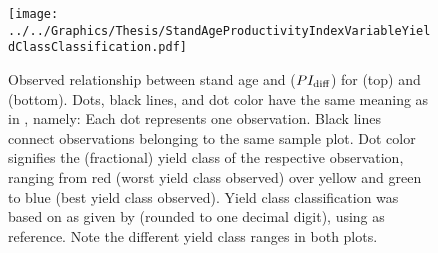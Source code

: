 \begin{figure}[t]
  \texttt{[image: ../../Graphics/Thesis/StandAgeProductivityIndexVariableYieldClassClassification.pdf]}
  \caption{Observed relationship between stand age and \ProductivityIndexVariableText{} (\(PI_{\text{diff}}{}\)) for \Beech{} (top) and \Spruce{} (bottom).  Dots, black lines, and dot color have the same meaning as in , namely:  Each dot represents one observation.  Black lines connect observations belonging to the same sample plot.  Dot color signifies the (fractional) yield class of the respective observation, ranging from red (worst yield class observed) over yellow and green to blue (best yield class observed).  Yield class classification was based on \ProductivityIndexText{} as given by  (rounded to one decimal digit), using  as reference.  Note the different yield class ranges in both plots.}
  \label{fig:StandAgeProductivityIndexVariableYieldClassClassification}
\end{figure}


\clearpage{}


